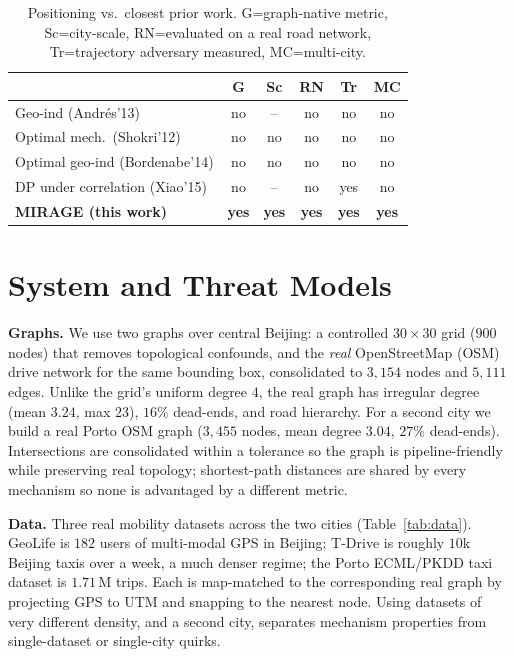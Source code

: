 \documentclass[10pt,journal,compsoc]{IEEEtran}
\begin{document}
\begin{table}[t]\centering
\caption{Positioning vs.\ closest prior work. G=graph-native metric,
Sc=city-scale, RN=evaluated on a real road network, Tr=trajectory adversary
measured, MC=multi-city.}
\label{tab:related}
\begin{tabular}{lccccc}
\toprule
 & G & Sc & RN & Tr & MC \\
\midrule
Geo-ind (Andr\'{e}s'13) \cite{andres2013}          & no  & --  & no  & no  & no \\
Optimal mech.\ (Shokri'12) \cite{shokri2012}        & no  & no  & no  & no  & no \\
Optimal geo-ind (Bordenabe'14) \cite{bordenabe2014} & no  & no  & no  & no  & no \\
DP under correlation (Xiao'15) \cite{xiao2015}       & no  & --  & no  & yes & no \\
\textbf{MIRAGE (this work)}                          & \textbf{yes} & \textbf{yes} & \textbf{yes} & \textbf{yes} & \textbf{yes} \\
\bottomrule
\end{tabular}
\end{table}

\section{System and Threat Models}
\label{sec:sysmodel}
\textbf{Graphs.} We use two graphs over central Beijing: a controlled
$30\times30$ grid ($900$ nodes) that removes topological confounds, and the
\emph{real} OpenStreetMap (OSM) drive network for the same bounding box,
consolidated to $3{,}154$ nodes and $5{,}111$ edges. Unlike the grid's uniform
degree $4$, the real graph has irregular degree (mean $3.24$, max $23$), $16\%$
dead-ends, and road hierarchy. For a second city we build a real Porto OSM graph
($3{,}455$ nodes, mean degree $3.04$, $27\%$ dead-ends). Intersections are
consolidated within a tolerance so the graph is pipeline-friendly while preserving
real topology; shortest-path distances are shared by every mechanism so none is
advantaged by a different metric.

\textbf{Data.} Three real mobility datasets across the two cities
(Table~\ref{tab:data}). GeoLife \cite{zheng2009,zheng2008} is $182$ users of
multi-modal GPS in Beijing; T-Drive is roughly $10$k Beijing taxis over a week, a
much denser regime; the Porto ECML/PKDD taxi dataset is $1.71$\,M trips. Each is
map-matched to the corresponding real graph by projecting GPS to UTM and snapping
to the nearest node. Using datasets of very different density, and a second city,
separates mechanism properties from single-dataset or single-city quirks.
\end{document}

